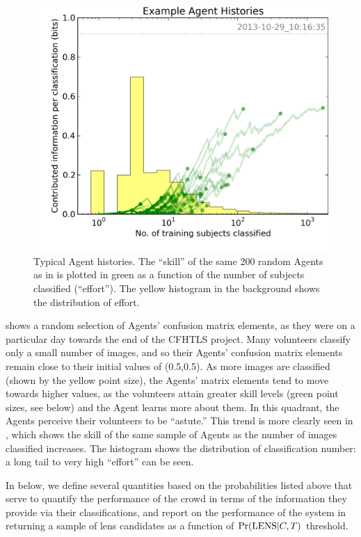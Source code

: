 \documentclass[useAMS,usenatbib,a4paper]{mn2e}
\begin{document}
\begin{figure}
\centering\includegraphics[width=0.9\linewidth]{sw-system-figs/CFHTLS_2013-10-29_10:16:35_histories.png}
\caption{Typical \SW Agent histories. The ``skill'' of the  same 200 random
Agents  as in  is plotted in green as a function
of the number  of subjects classified (``effort''). The yellow histogram in
the background shows the distribution of effort.}
\label{fig:swap:agent-histories}
\end{figure}

 shows a random selection of Agents'
confusion matrix elements, as they were on a particular day towards the end of
the CFHTLS project. Many volunteers classify  only a small number of images,
and so their Agents' confusion matrix elements remain close to their initial
values of (0.5,0.5). As more images are classified (shown by the yellow point
size), the Agents' matrix elements tend to move towards higher values, as the
volunteers attain greater skill levels (green point sizes, see
 below) and the Agent learns more about them. In this
quadrant, the Agents perceive their volunteers to be ``astute.'' This trend is
more clearly seen in , which shows the skill of
the same sample of Agents as the number of images classified increases. The
histogram shows the distribution of classification number: a long tail to very
high ``effort'' can be seen. 

In  below, we define several quantities based on the 
probabilities listed above that serve to quantify the performance of the crowd
in terms of the information they provide via their classifications, and report
on the performance of the system in returning a sample of lens candidates
as a function of ${\rm Pr}({\rm LENS}|C,T)$ threshold.
\end{document}
